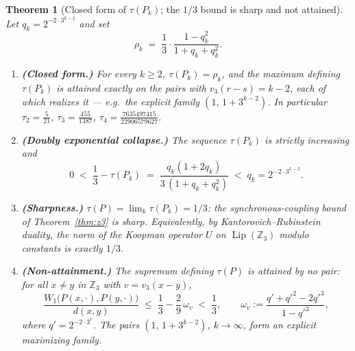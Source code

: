 \documentclass[11pt]{amsart}
\newtheorem{theorem}{Theorem}[section]
\theoremstyle{definition}
\theoremstyle{remark}
\newcommand{\Z}{\mathbb{Z}}
\newcommand{\Zthree}{\Z_3}
\newcommand{\Lip}{\operatorname{Lip}}
\newcommand{\dW}{W_1}
\begin{document}
\begin{theorem}[Closed form of $\tau(P_k)$; the $1/3$ bound is sharp and not attained]\label{thm:tausharp}
Let $q_k = 2^{-2\cdot 3^{k-2}}$ and set
\[
\rho_k \;=\; \frac13 \cdot \frac{1 - q_k^2}{1 + q_k + q_k^2} .
\]
\begin{enumerate}
\item \textbf{(Closed form.)} For every $k \ge 2$, $\tau(P_k) = \rho_k$, and the maximum defining $\tau(P_k)$ is attained exactly on the pairs with $v_3(r - s) = k-2$, each of which realizes it --- e.g.\ the explicit family $(1,\, 1 + 3^{k-2})$. In particular $\tau_2 = \tfrac{5}{21}$, $\tau_3 = \tfrac{455}{1387}$, $\tau_4 = \tfrac{7635497415}{22906579627}$.
\item \textbf{(Doubly exponential collapse.)} The sequence $\tau(P_k)$ is strictly increasing and
\[
0 \;<\; \frac13 - \tau(P_k) \;=\; \frac{q_k (1 + 2 q_k)}{3\,(1 + q_k + q_k^2)} \;<\; q_k = 2^{-2\cdot 3^{k-2}} .
\]
\item \textbf{(Sharpness.)} $\tau(P) = \lim_k \tau(P_k) = 1/3$: the synchronous-coupling bound of Theorem~\ref{thm:z3} is sharp. Equivalently, by Kantorovich--Rubinstein duality, the norm of the Koopman operator $U$ on $\Lip(\Zthree)$ modulo constants is exactly $1/3$.
\item \textbf{(Non-attainment.)} The supremum defining $\tau(P)$ is attained by no pair: for all $x \ne y$ in $\Zthree$ with $v = v_3(x-y)$,
\[
\frac{\dW\bigl(P(x,\cdot), P(y,\cdot)\bigr)}{d(x,y)} \;\le\; \frac13 - \frac29\,\omega_v \;<\; \frac13,
\qquad
\omega_v := \frac{q' + q'^2 - 2q'^3}{1 - q'^3},
\]
where $q' = 2^{-2\cdot 3^{v}}$. The pairs $(1,\, 1 + 3^{k-2})$, $k \to \infty$, form an explicit maximizing family.
\end{enumerate}
\end{theorem}
\end{document}

